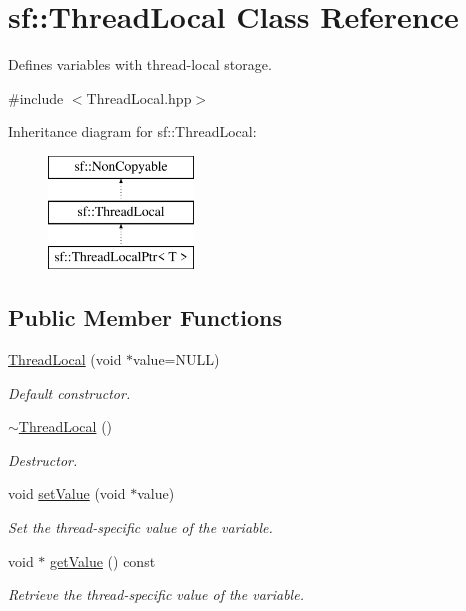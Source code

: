 \hypertarget{classsf_1_1ThreadLocal}{\section{sf\-:\-:Thread\-Local Class Reference}
\label{classsf_1_1ThreadLocal}
}


Defines variables with thread-\/local storage.  




{\ttfamily \#include $<$Thread\-Local.\-hpp$>$}

Inheritance diagram for sf\-:\-:Thread\-Local\-:\begin{figure}[H]
\begin{center}
\leavevmode
\includegraphics[height=3.000000cm]{classsf_1_1ThreadLocal}
\end{center}
\end{figure}
\subsection*{Public Member Functions}
\begin{DoxyCompactItemize}
\item 
\hyperlink{classsf_1_1ThreadLocal_a44ea3c4be4eef118080275cbf4cf04cd}{Thread\-Local} (void $\ast$value=N\-U\-L\-L)
\begin{DoxyCompactList}\small\item\em Default constructor. \end{DoxyCompactList}\item 
\hypertarget{classsf_1_1ThreadLocal_acc612bddfd0f0507b1c5da8b3b8c75c2}{\hyperlink{classsf_1_1ThreadLocal_acc612bddfd0f0507b1c5da8b3b8c75c2}{$\sim$\-Thread\-Local} ()}\label{classsf_1_1ThreadLocal_acc612bddfd0f0507b1c5da8b3b8c75c2}

\begin{DoxyCompactList}\small\item\em Destructor. \end{DoxyCompactList}\item 
void \hyperlink{classsf_1_1ThreadLocal_ab7e334c83d77644a8e67ee31c3230007}{set\-Value} (void $\ast$value)
\begin{DoxyCompactList}\small\item\em Set the thread-\/specific value of the variable. \end{DoxyCompactList}\item 
void $\ast$ \hyperlink{classsf_1_1ThreadLocal_aef35a39686eac4b6634a6e5605aacfd7}{get\-Value} () const 
\begin{DoxyCompactList}\small\item\em Retrieve the thread-\/specific value of the variable. \end{DoxyCompactList}\end{DoxyCompactItemize}


